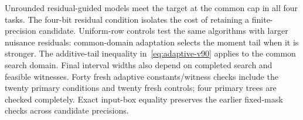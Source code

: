 Unrounded residual-guided models meet the target at the common cap in all four tasks. The four-bit residual condition isolates the cost of retaining a finite-precision candidate. Uniform-row controls test the same algorithms with larger nuisance residuals: common-domain adaptation selects the moment tail when it is stronger. The additive-tail inequality in~\eqref{eq:adaptive-v90} applies to the common search domain. Final interval widths also depend on completed search and feasible witnesses. Forty fresh adaptive constants/witness checks include the twenty primary conditions and twenty fresh controls; four primary trees are checked completely. Exact input-box equality preserves the earlier fixed-mask checks across candidate precisions.
